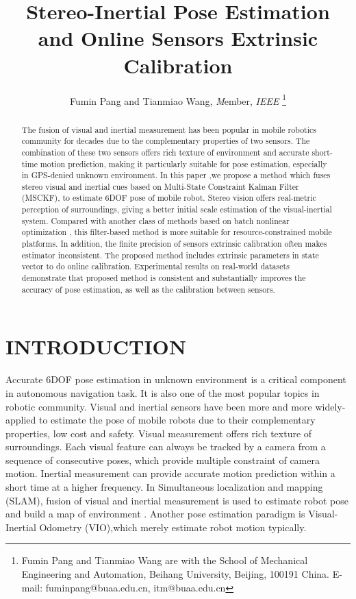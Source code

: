 \documentclass[a4paper, 10pt, conference]{ieeeconf}      %
\title{\LARGE \bf
Stereo-Inertial Pose Estimation and Online Sensors 
Extrinsic Calibration
}
\author{Fumin Pang and Tianmiao Wang, \emph Member, \emph {IEEE}%
\thanks{Fumin Pang and Tianmiao Wang are with the School of Mechanical Engineering and
	Automation, Beihang University, Beijing, 100191 China.
        {E-mail: fuminpang@buaa.edu.cn, itm@buaa.edu.cn}}%
}
\begin{document}
\maketitle
\thispagestyle{empty}
\pagestyle{empty}


\begin{abstract}

The fusion of visual and inertial measurement has been popular in mobile robotics community for decades due to the complementary properties of two sensors. The combination of these two sensors offers rich  texture of environment and accurate short-time motion prediction, making it particularly suitable for pose estimation, especially in GPS-denied unknown environment. In this paper ,we propose a method which fuses stereo visual and inertial cues based on Multi-State Constraint Kalman Filter (MSCKF), to estimate 6DOF pose of mobile robot. Stereo vision offers real-metric perception of surroundings, giving a better initial scale estimation of the visual-inertial system. Compared with another class of methods based on batch nonlinear optimization , this filter-based method is more suitable for resource-constrained mobile platforms. In addition, the finite precision of sensors extrinsic calibration often makes estimator inconsistent. The proposed method includes extrinsic parameters in state vector to do online calibration. Experimental results on real-world datasets demonstrate that proposed method is consistent and substantially improves the accuracy of pose estimation, as well as the calibration between sensors.

\end{abstract}


\section{INTRODUCTION}

Accurate 6DOF pose estimation in unknown environment is a critical component in autonomous navigation task. It is also one of the most popular topics in robotic community. Visual and inertial sensors have been more and more widely-applied to estimate the pose of mobile robots due to their complementary properties, low cost and safety. Visual measurement offers rich texture of surroundings. Each visual feature can always be tracked by a camera from a sequence  of consecutive poses, which provide  multiple constraint of camera motion. Inertial measurement can provide accurate motion prediction within a short time at  a higher frequency. In Simultaneous localization and mapping (SLAM), fusion of visual and inertial measurement is used to estimate robot pose and build a map of environment \cite{eade2006scalable} \cite{strelow2004motion}. Another pose estimation paradigm is Visual-Inertial Odometry (VIO),which merely  estimate robot motion typically. 
\end{document}
